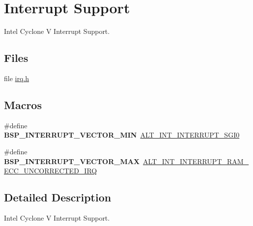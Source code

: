 \hypertarget{group__RTEMSBSPsARMCycVIRQ}{}\section{Interrupt Support}
\label{group__RTEMSBSPsARMCycVIRQ}


Intel Cyclone V Interrupt Support.  


\subsection*{Files}
\begin{DoxyCompactItemize}
\item 
file \mbox{\hyperlink{bsps_2arm_2altera-cyclone-v_2include_2bsp_2irq_8h}{irq.\+h}}
\end{DoxyCompactItemize}
\subsection*{Macros}
\begin{DoxyCompactItemize}
\item 
\mbox{\label{group__RTEMSBSPsARMCycVIRQ_ga64cbb02dfea4d6923abccaa0087d2a0d}} 
\#define {\bfseries B\+S\+P\+\_\+\+I\+N\+T\+E\+R\+R\+U\+P\+T\+\_\+\+V\+E\+C\+T\+O\+R\+\_\+\+M\+IN}~\mbox{\hyperlink{group__INT__COMMON_ggaf87a5a7f416fc6f679b59dadacbeb592a8057a3e1fb67a8ba98a4e589a391d611}{A\+L\+T\+\_\+\+I\+N\+T\+\_\+\+I\+N\+T\+E\+R\+R\+U\+P\+T\+\_\+\+S\+G\+I0}}
\item 
\mbox{\label{group__RTEMSBSPsARMCycVIRQ_gae4a2cdda5816a4c83c2fac0a49880c6e}} 
\#define {\bfseries B\+S\+P\+\_\+\+I\+N\+T\+E\+R\+R\+U\+P\+T\+\_\+\+V\+E\+C\+T\+O\+R\+\_\+\+M\+AX}~\mbox{\hyperlink{group__INT__COMMON_ggaf87a5a7f416fc6f679b59dadacbeb592afc1e4bc340fd07bd7085f144a672b291}{A\+L\+T\+\_\+\+I\+N\+T\+\_\+\+I\+N\+T\+E\+R\+R\+U\+P\+T\+\_\+\+R\+A\+M\+\_\+\+E\+C\+C\+\_\+\+U\+N\+C\+O\+R\+R\+E\+C\+T\+E\+D\+\_\+\+I\+RQ}}
\end{DoxyCompactItemize}


\subsection{Detailed Description}
Intel Cyclone V Interrupt Support. 

